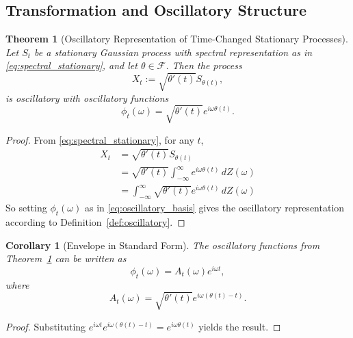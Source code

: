 \documentclass[12pt]{article}
\newtheorem{theorem}{Theorem}[section]
\newtheorem{corollary}{Corollary}[section]
\begin{document}
\subsection{Transformation and Oscillatory Structure}

\begin{theorem}[Oscillatory Representation of Time-Changed Stationary Processes]\label{thm:oscillatory_representation}
Let $S_t$ be a stationary Gaussian process with spectral representation as in \eqref{eq:spectral_stationary}, and let $\theta \in \mathcal{F}$. Then the process
\begin{equation}
    X_t := \sqrt{\theta'(t)} S_{\theta(t)},
    \label{eq:timechange_def}
\end{equation}
is oscillatory with oscillatory functions
\begin{equation}
    \phi_t(\omega) = \sqrt{\theta'(t)} e^{i\omega\theta(t)}.
    \label{eq:oscillatory_basis}
\end{equation}
\end{theorem}

\begin{proof}
From \eqref{eq:spectral_stationary}, for any $t$,
\begin{align}
    X_t &= \sqrt{\theta'(t)} S_{\theta(t)} \\ 
        &= \sqrt{\theta'(t)} \int_{-\infty}^{\infty} e^{i\omega\theta(t)}\, dZ(\omega) \nonumber \\
        &= \int_{-\infty}^{\infty} \sqrt{\theta'(t)}  e^{i\omega\theta(t)}\, dZ(\omega) \nonumber
\end{align}
So setting $\phi_t(\omega)$ as in \eqref{eq:oscillatory_basis} gives the oscillatory representation according to Definition~\ref{def:oscillatory}.
\end{proof}

\begin{corollary}[Envelope in Standard Form]\label{cor:envelope_standard}
The oscillatory functions from Theorem~\ref{thm:oscillatory_representation} can be written as
\begin{equation}
    \phi_t(\omega) = A_t(\omega) e^{i\omega t},\label{eq:oscillatory_standard}
\end{equation}
where
\begin{equation}
    A_t(\omega) = \sqrt{\theta'(t)} e^{i\omega(\theta(t) - t)}.
    \label{eq:oscillatory_envelope}
\end{equation}
\end{corollary}

\begin{proof}
Substituting $e^{i\omega t} e^{i\omega (\theta(t)-t)} = e^{i\omega \theta(t)}$ yields the result.
\end{proof}
\end{document}
